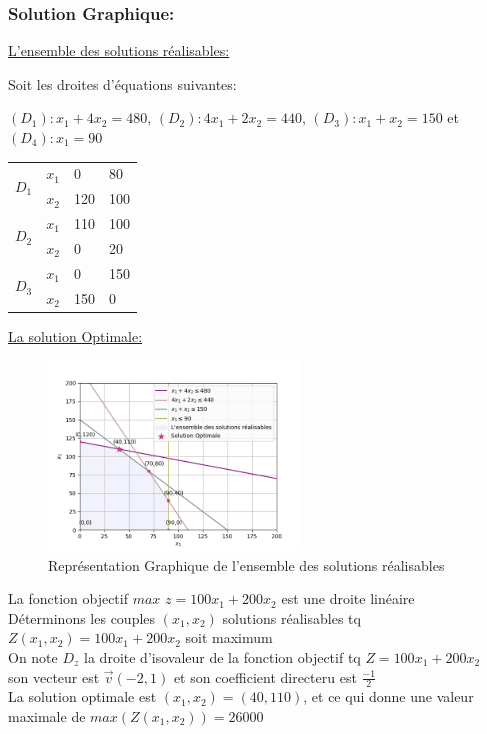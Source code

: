 \documentclass[]{book}
\begin{document}
\subsubsection{Solution Graphique:}
\underline{L'ensemble des solutions réalisables:}

Soit les droites d'équations suivantes:
\begin{center}
    $(D_1): x_1 + 4x_2 = 480$, $(D_2): 4x_1 + 2 x_2 = 440$, $(D_3): x_1 + x_2 = 150$ et $(D_4): x_1 = 90$
\end{center}
\begin{center}
    \begin{tabular}{ | m{0.5cm} | m{0.5cm}| m{1cm} | m{1cm} | } 
      \hline
        \multirow{2}{4em}{$D_1$} & $x_1$  & 0 & 80 \\
        \cline{2-4} & $x_2$  & 120 & 100 \\
        \hline
        
        \multirow{2}{4em}{$D_2$} & $x_1$ & 110 & 100 \\
        \cline{2-4} & $x_2$ & 0 & 20 \\
        \hline
        
        \multirow{2}{4em}{$D_3$} & $x_1$ & 0 & 150 \\
        \cline{2-4} & $x_2$ & 150 & 0 \\
        \hline
    \end{tabular}
\end{center}

\underline{La solution Optimale:}

\begin{figure}[H]
    \centering
    \includegraphics[width=0.6\textwidth]{Figures/figure_01.png}
    \caption{Représentation Graphique de l'ensemble des solutions réalisables}
    \label{fig:placeholder}
\end{figure}
\newpage
La fonction objectif $max$ $z = 100 x_1 + 200 x_2$ est une droite linéaire\\
Déterminons les couples $(x_1, x_2)$ solutions réalisables tq $Z(x_1,x_2) = 100 x_1 + 200 x_2$ soit maximum\\
On note $D_z$ la droite d'isovaleur de la fonction objectif tq $Z = 100 x_1 + 200 x_2$\\
son vecteur est $\Vec{v}(-2,1)$ et son coefficient directeru est $\frac{-1}{2}$\\
La solution optimale est $(x_1,x_2)=(40,110)$, et ce qui donne une valeur maximale de $max(Z(x_1,x_2)) = 26000$
\end{document}
